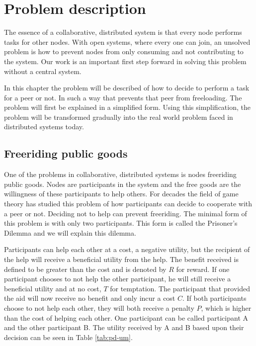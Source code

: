 \chapter{Problem description}
The essence of a collaborative, distributed system is that every node performs tasks for other nodes.
With open systems, where every one can join, an unsolved problem is how to prevent nodes
from only consuming and not contributing to the system.
Our work is an important first step forward in solving this problem without a central system.

In this chapter the problem will be described of how to decide to perform a task for a peer or not.
In such a way that prevents that peer from freeloading.
The problem will first be explained in a simplified form.
Using this simplification, the problem will be transformed gradually
into the real world problem faced in distributed systems today.

\section{Freeriding public goods}
One of the problems in collaborative, distributed systems is nodes freeriding public goods.
Nodes are participants in the system and the free goods are the willingness of these participants to help others.
For decades the field of game theory has studied this problem of how
participants can decide to cooperate with a peer or not\cite{Hardin-Tragedy}.
Deciding not to help can prevent freeriding.
The minimal form of this problem is with only two participants.
This form is called the Prisoner's Dilemma\cite{Nowak-PrisonerDilemma}\cite{Lai-Incentives}
and we will explain this dilemma.

Participants can help each other at a cost, a negative utility,
but the recipient of the help will receive a beneficial utility from the help.
The benefit received is defined to be greater
than the cost and is denoted by $R$ for reward.
If one participant chooses to not help the other participant,
he will still receive a beneficial utility and at no cost, $T$ for temptation.
The participant that provided the aid will now receive no benefit and only incur a cost $C$.
If both participants choose to not help each other,
they will both receive a penalty $P$, which is higher than the cost of helping each other.
One participant can be called participant A and the other participant B.
The utility received by A and B based upon their decision can be seen in Table \ref{tab:pd-um}.

